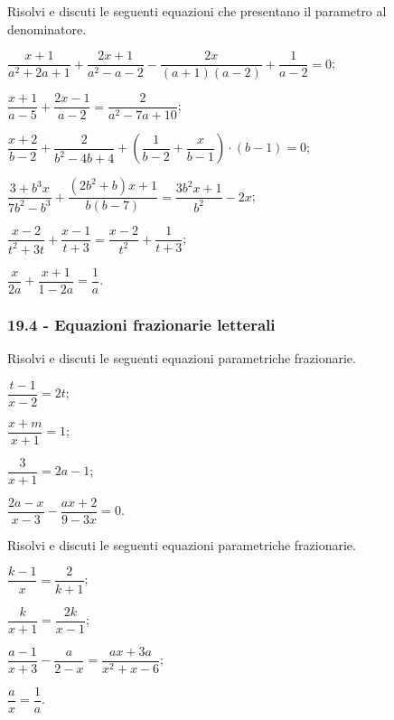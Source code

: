 \begin{esercizio}[\Ast]
\label{ese:19.13}
Risolvi e discuti le seguenti equazioni che presentano il parametro al denominatore.
\begin{enumeratea}
 \item $\dfrac{x+1}{a^{2}+2a+1}+\dfrac{2x+1}{a^{2}-a-2}-\dfrac{2x}{(a+1)(a-2)}+\dfrac{1}{a-2}=0$;
 \item $\dfrac{x+1}{a-5}+\dfrac{2x-1}{a-2}=\dfrac{2}{a^{2}-7a+10}$;
 \item $\dfrac{x+2}{b-2}+\dfrac{2}{b^{2}-4b+4}+\left(\dfrac{1}{b-2}+\dfrac{x}{b-1}\right)\cdot (b-1)=0$;
 \item $\dfrac{3+b^{3}x}{7b^{2}-b^{3}}+\dfrac{(2b^{2}+b)x+1}{b(b-7)}=\dfrac{3b^{2}x+1}{b^{2}}-2x$;
 \item $\dfrac{x-2}{t^{2}+3t}+\dfrac{x-1}{t+3}=\dfrac{x-2}{t^{2}}+\dfrac{1}{t+3}$;
 \item $\dfrac{x}{2a}+\dfrac{x+1}{1-2a}=\dfrac{1}{a}$.
\end{enumeratea}
\end{esercizio}
\pagebreak
\subsubsection*{19.4 - Equazioni frazionarie letterali}

\begin{esercizio}[\Ast]
\label{ese:19.14}
Risolvi e discuti le seguenti equazioni parametriche frazionarie.
\begin{multicols}{2}
\begin{enumeratea}
 \item $\dfrac{t-1}{x-2}=2t$;
 \item $\dfrac{x+m}{x+1}=1$;
 \item $\dfrac{3}{x+1}=2a-1$;
 \item $\dfrac{2a-x}{x-3}-\dfrac{ax+2}{9-3x}=0$.
\end{enumeratea}
\end{multicols}
\end{esercizio}

\begin{esercizio}[\Ast]
\label{ese:19.15}
Risolvi e discuti le seguenti equazioni parametriche frazionarie.
\begin{multicols}{2}
\begin{enumeratea}
 \item $\dfrac{k-1}{x}=\dfrac{2}{k+1}$;
 \item $\dfrac{k}{x+1}=\dfrac{2k}{x-1}$;
 \item $\dfrac{a-1}{x+3}-\dfrac{a}{2-x}=\dfrac{ax+3a}{x^{2}+x-6}$;
 \item $\dfrac{a}{x}=\dfrac{1}{a}$.
\end{enumeratea}
\end{multicols}
\end{esercizio}

